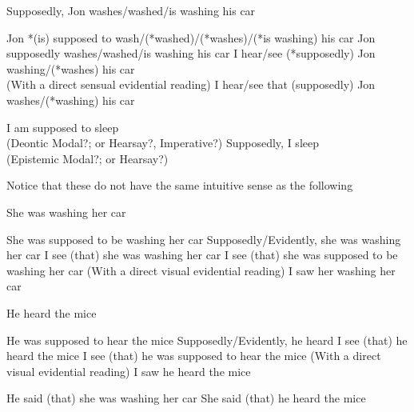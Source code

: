 \documentclass{article}
\begin{document}
\begin{exe}

\ex Supposedly, Jon washes/washed/is washing his car
\begin{xlist}
\ex Jon *(is) supposed to wash/(*washed)/(*washes)/(*is washing) his car
\ex Jon supposedly washes/washed/is washing his car
\ex I hear/see (*supposedly) Jon washing/(*washes)  his car\\(With a direct sensual evidential reading)
\ex I hear/see that (supposedly) Jon washes/(*washing) his car
\end{xlist}
\end{exe}

\begin{exe}
\ex I am supposed to sleep\\(Deontic Modal?; or Hearsay?, Imperative?)
\ex Supposedly, I sleep\\(Epistemic Modal?; or Hearsay?)
\end{exe}

Notice that these do not have the same intuitive sense as the following

\begin{exe}
\ex
\begin{xlist}
\ex She was washing her car
\begin{xlist}
\ex She was supposed to be washing her car
\ex Supposedly/Evidently, she was washing her car
\ex I see (that) she was washing her car
\ex I see (that) she was supposed to be washing her car
(With a direct visual evidential reading)
\ex I saw her washing her car
\end{xlist}
\ex He heard the mice
\begin{xlist}
\ex He was supposed to hear the mice
\ex Supposedly/Evidently, he heard
\ex I see (that) he heard the mice
\ex I see (that) he was supposed to hear the mice
(With a direct visual evidential reading)
\ex I saw he heard the mice
\end{xlist}
\end{xlist}
\end{exe}

\begin{exe}
\ex 
\begin{xlist}
\ex He said (that) she was washing her car
\ex She said (that) he heard the mice
\end{xlist}
\end{exe}
\end{document}
